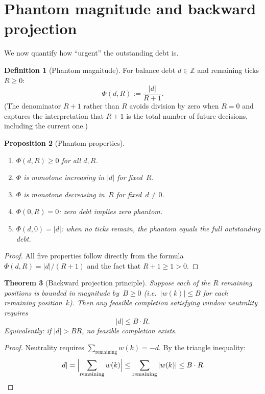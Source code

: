 \documentclass[11pt]{amsart}
\newtheorem{theorem}{Theorem}[section]
\newtheorem{proposition}[theorem]{Proposition}
\theoremstyle{definition}
\newtheorem{definition}[theorem]{Definition}
\theoremstyle{remark}
\newcommand{\Z}{\mathbb{Z}}
\begin{document}
\section{Phantom magnitude and backward projection}\label{sec:phantom}

We now quantify how ``urgent'' the outstanding debt is.

\begin{definition}[Phantom magnitude]\label{def:phantom}
For balance debt $d\in\Z$ and remaining ticks $R\ge 0$:
\[
\Phi(d,R):=\frac{|d|}{R+1}.
\]
(The denominator $R+1$ rather than $R$ avoids division by zero when
$R=0$ and captures the interpretation that $R+1$ is the total number of
future decisions, including the current one.)
\end{definition}

\begin{proposition}[Phantom properties]\label{prop:phantom}
\begin{enumerate}[label=\textup{(\alph*)},nosep]
\item $\Phi(d,R)\ge 0$ for all $d,R$.
\item $\Phi$ is monotone increasing in $|d|$ for fixed~$R$.
\item $\Phi$ is monotone decreasing in~$R$ for fixed~$d\neq 0$.
\item $\Phi(0,R)=0$: zero debt implies zero phantom.
\item $\Phi(d,0)=|d|$: when no ticks remain, the phantom equals
  the full outstanding debt.
\end{enumerate}
\end{proposition}
\begin{proof}
All five properties follow directly from the formula
$\Phi(d,R)=|d|/(R+1)$ and the fact that $R+1\ge1>0$.
\end{proof}

\begin{theorem}[Backward projection principle]\label{thm:backward}
Suppose each of the $R$ remaining positions is bounded in magnitude
by~$B\ge 0$ (i.e.\ $|w(k)|\le B$ for each remaining position~$k$).
Then any feasible completion satisfying window neutrality requires
\[
|d|\le B\cdot R.
\]
Equivalently: if $|d|>BR$, no feasible completion exists.
\end{theorem}
\begin{proof}
Neutrality requires $\sum_{\text{remaining}}w(k)=-d$.
By the triangle inequality:
\[
|d|
=\Bigl|\sum_{\text{remaining}} w(k)\Bigr|
\le\sum_{\text{remaining}}|w(k)|
\le B\cdot R.
\qedhere
\]
\end{proof}
\end{document}
